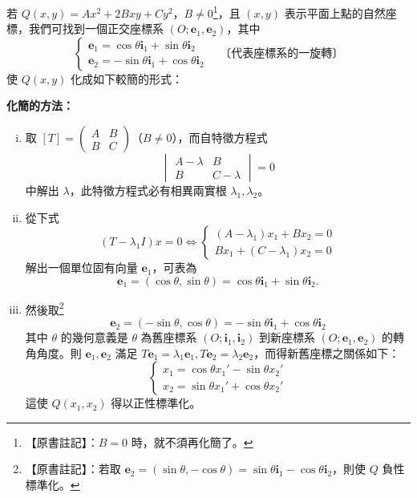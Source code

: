 若 $Q(x, y) = Ax^2 + 2Bxy + Cy^2$，$B \ne 0$\label{note:b4s-ch4-b-zero}\footnote{【原書註記】：$B = 0$ 時，就不須再化簡了。}，且 $(x, y)$ 表示平面上點的自然座標，我們可找到一個正交座標系 $(O; \mathbf{e}_1, \mathbf{e}_2)$，其中
\[
\begin{cases}
\mathbf{e}_1 = \cos\theta \mathbf{i}_1 + \sin\theta \mathbf{i}_2 \\
\mathbf{e}_2 = -\sin\theta \mathbf{i}_1 + \cos\theta \mathbf{i}_2
\end{cases}
\quad \text{〔代表座標系的一旋轉〕}
\]
使 $Q(x, y)$ 化成如下較簡的形式：
\begin{center}
\textbf{化簡的方法：}
\end{center}
\begin{enumerate}[(i)]
  \item 取 $[T] = \begin{pmatrix} A & B \\ B & C \end{pmatrix}$（$B \ne 0$），而自特徵方程式
  \[
  \begin{vmatrix} A - \lambda & B \\ B & C - \lambda \end{vmatrix} = 0
  \]
  中解出 $\lambda$，此特徵方程式必有相異兩實根 $\lambda_1, \lambda_2$。
  
  \item 從下式
  \[
  (T - \lambda_1 I)x = 0 \iff
  \begin{cases}
  (A - \lambda_1)x_1 + Bx_2 = 0 \\
  Bx_1 + (C - \lambda_1)x_2 = 0
  \end{cases}
  \]
  解出一個單位固有向量 $\mathbf{e}_1$，可表為
  \[
  \mathbf{e}_1 = (\cos\theta, \sin\theta) = \cos\theta \mathbf{i}_1 + \sin\theta \mathbf{i}_2.
  \]
  
  \item 然後取\label{note:b4s-ch4-e2-choice}\footnote{【原書註記】：若取 $\mathbf{e}_2 = (\sin\theta, -\cos\theta) = \sin\theta \mathbf{i}_1 - \cos\theta \mathbf{i}_2$，則使 $Q$ 負性標準化。}
  \[
  \mathbf{e}_2 = (-\sin\theta, \cos\theta) = -\sin\theta \mathbf{i}_1 + \cos\theta \mathbf{i}_2
  \]
  其中 $\theta$ 的幾何意義是 $\theta$ 為舊座標系 $(O; \mathbf{i}_1, \mathbf{i}_2)$ 到新座標系 $(O; \mathbf{e}_1, \mathbf{e}_2)$ 的轉角角度。則 $\mathbf{e}_1, \mathbf{e}_2$ 滿足 $T\mathbf{e}_1 = \lambda_1 \mathbf{e}_1, T\mathbf{e}_2 = \lambda_2 \mathbf{e}_2$，而得新舊座標之關係如下：
  \[
  \begin{cases}
  x_1 = \cos\theta x_1' - \sin\theta x_2' \\
  x_2 = \sin\theta x_1' + \cos\theta x_2'
  \end{cases}
  \]
  這使 $Q(x_1, x_2)$ 得以正性標準化。
\end{enumerate}

